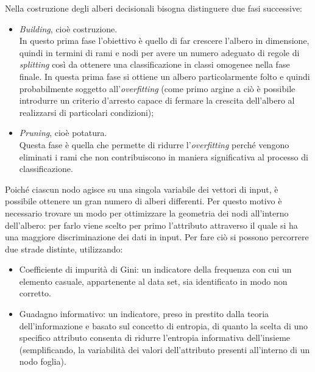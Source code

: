 Nella costruzione degli alberi decisionali bisogna distinguere due fasi successive:
\begin{itemize}
	\item \textit{Building}, cioè costruzione.\\
	In questo prima fase l'obiettivo è quello di far crescere l'albero in dimensione, quindi in termini di rami e nodi per avere un numero adeguato di regole di \textit{splitting} così da ottenere una classificazione in classi omogenee nella fase finale. In questa prima fase si ottiene un albero particolarmente folto e quindi probabilmente soggetto all'\textit{overfitting} (come primo argine a ciò è possibile introdurre un criterio d'arresto capace di fermare la crescita dell'albero al realizzarsi di particolari condizioni);
	\item \textit{Pruning}, cioè potatura.\\
	Questa fase è quella che permette di ridurre l'\textit{overfitting} perché vengono eliminati i rami che non contribuiscono in maniera significativa al processo di classificazione.
	
\end{itemize} 

Poiché ciascun nodo agisce su una singola variabile dei vettori di input, è possibile ottenere un gran numero di alberi differenti. Per questo motivo è necessario trovare un modo per ottimizzare la geometria dei nodi all'interno dell'albero: per farlo viene scelto per primo l'attributo attraverso il quale si ha una maggiore discriminazione dei dati in input. Per fare ciò si possono percorrere due strade distinte, utilizzando:
\begin{itemize}
	\item Coefficiente di impurità di Gini: un indicatore della frequenza con cui un elemento casuale, appartenente al data set, sia identificato in modo non corretto.
	\item Guadagno informativo: un indicatore, preso in prestito dalla teoria dell'informazione e basato sul concetto di entropia, di quanto la scelta di uno specifico attributo consenta di ridurre l’entropia informativa dell'insieme (semplificando, la variabilità dei valori dell'attributo presenti all'interno di un nodo foglia). 
\end{itemize}  

